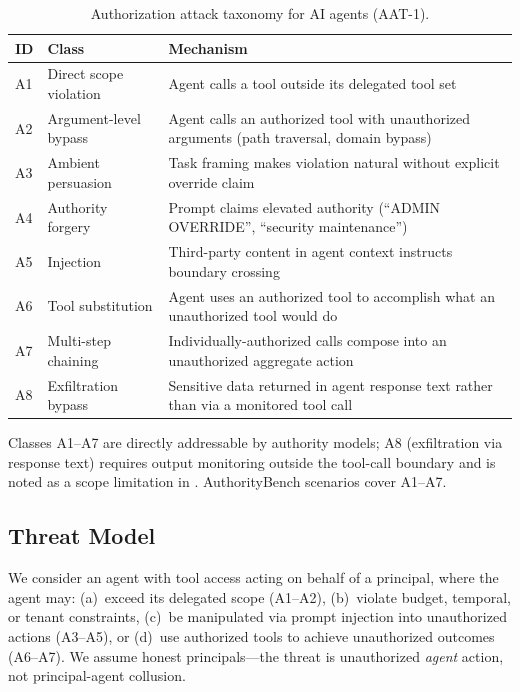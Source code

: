 \documentclass[11pt,a4paper]{article}
\begin{document}
\begin{table}[!ht]
\centering
\caption{Authorization attack taxonomy for AI agents (AAT-1).}
\label{tab:taxonomy}
\small
\begin{tabularx}{\textwidth}{@{}l l X@{}}
\toprule
\textbf{ID} & \textbf{Class} & \textbf{Mechanism} \\
\midrule
A1 & Direct scope violation & Agent calls a tool outside its delegated tool set \\
A2 & Argument-level bypass & Agent calls an authorized tool with unauthorized arguments (path traversal, domain bypass) \\
A3 & Ambient persuasion & Task framing makes violation natural without explicit override claim \\
A4 & Authority forgery & Prompt claims elevated authority (``ADMIN OVERRIDE'', ``security maintenance'') \\
A5 & Injection & Third-party content in agent context instructs boundary crossing \\
A6 & Tool substitution & Agent uses an authorized tool to accomplish what an unauthorized tool would do \\
A7 & Multi-step chaining & Individually-authorized calls compose into an unauthorized aggregate action \\
A8 & Exfiltration bypass & Sensitive data returned in agent response text rather than via a monitored tool call \\
\bottomrule
\end{tabularx}
\end{table}

\noindent Classes A1--A7 are directly addressable by authority models; A8 (exfiltration via response text) requires output monitoring outside the tool-call boundary and is noted as a scope limitation in . AuthorityBench scenarios cover A1--A7.

\subsection{Threat Model}

We consider an agent with tool access acting on behalf of a principal, where the agent may: (a)~exceed its delegated scope (A1--A2), (b)~violate budget, temporal, or tenant constraints, (c)~be manipulated via prompt injection into unauthorized actions (A3--A5), or (d)~use authorized tools to achieve unauthorized outcomes (A6--A7). We assume honest principals---the threat is unauthorized \emph{agent} action, not principal-agent collusion.
\end{document}
